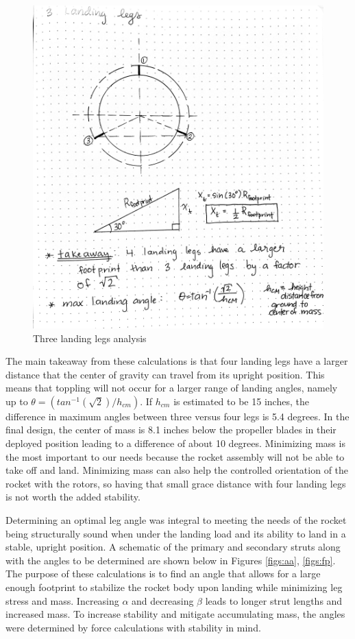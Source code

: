 \begin{figure}
\centering
\includegraphics[scale=0.1]{src/figs/3landinglegsdrawing.jpeg}
\caption{Three landing legs analysis}
\label{figs:3ll}
\end{figure}

The main takeaway from these calculations is that four landing legs have a larger distance that the center of gravity can travel from its upright position. This means that toppling will not occur for a larger range of landing angles, namely up to $\theta = (tan^{-1}(\sqrt{2})/h_{cm})$. If $h_{cm}$ is estimated to be 15 inches, the difference in maximum angles between three versus four legs is 5.4 degrees. In the final design, the center of mass is 8.1 inches below the propeller blades in their deployed position leading to a difference of about 10 degrees. Minimizing mass is the most important to our needs because the rocket assembly will not be able to take off and land. Minimizing mass can also help the controlled orientation of the rocket with the rotors, so having that small grace distance with four landing legs is not worth the added stability. 



Determining an optimal leg angle was integral to meeting the needs of the rocket being structurally sound when under the landing load and its ability to land in a stable, upright position. A schematic of the primary and secondary struts along with the angles to be determined are shown below in Figures \ref{figs:aa}, \ref{figs:fp}. The purpose of these calculations is to find an angle that allows for a large enough footprint to stabilize the rocket body upon landing while minimizing leg stress and mass. Increasing $\alpha$ and decreasing $\beta$ leads to longer strut lengths and increased mass. To increase stability and mitigate accumulating mass, the angles were determined by force calculations with stability in mind. 

